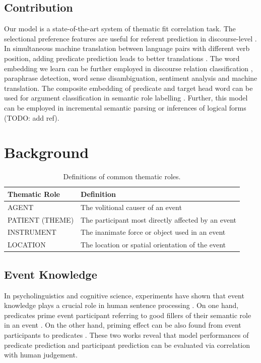 \documentclass[a4paper]{article}
\begin{document}
\subsection{Contribution} \label{sec:contribution}
Our model is a state-of-the-art system of thematic fit correlation task. The selectional preference features are useful for referent prediction in discourse-level \citep{modi2017modeling}. In simultaneous machine translation between language pairs with different verb position, adding predicate prediction leads to better translations \citep{grissom2014don}. The word embedding we learn can be further employed in discourse relation classification \citep{shi2017need, rutherford2017systematic}, paraphrase detection, word sense disambiguation, sentiment analysis and machine translation. The composite embedding of predicate and target head word can be used for argument classification in semantic role labelling \citep{roth2016neural}. Further, this model can be employed in incremental semantic parsing \citep{konstas2014incremental, konstas2015semantic} or inferences of logical forms (TODO: add ref). 



\newpage
\section{Background}


\begin{table}[t]
\centering
\begin{tabular}{l|l}
\textbf{Thematic Role}  &   \textbf{Definition} \\ \hline
AGENT                   &   The volitional causer of an event \\
PATIENT (THEME)         &   The participant most directly affected by an event \\
INSTRUMENT              &   The inanimate force or object used in an event \\
LOCATION                &   The location or spatial orientation of the event \\
\end{tabular}
\caption{\label{tab:thematic} Definitions of common thematic roles.}
\end{table}


\subsection{Event Knowledge} \label{sec:event}
In psycholinguistics and cognitive science, experiments have shown that event knowledge plays a crucial role in human sentence processing \citep{camblin2007interplay}. On one hand, predicates prime event participant referring to good fillers of their semantic role in an event \citep{ferretti2001integrating}. On the other hand, priming effect can be also found from event participants to predicates \citep{mcrae2005basis}. These two works reveal that model performances of predicate prediction and participant prediction can be evaluated via correlation with human judgement. 
\end{document}
